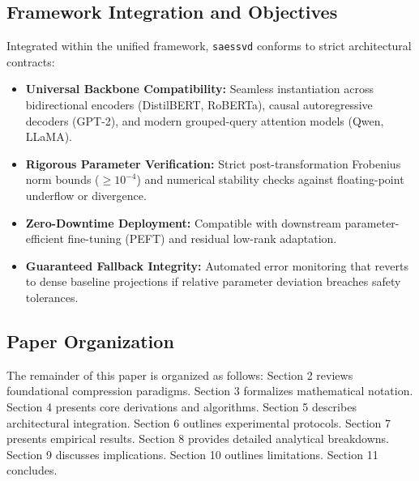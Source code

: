 \subsection{Framework Integration and Objectives}
Integrated within the unified framework, \texttt{saessvd} conforms to strict architectural contracts:
\begin{itemize}
\item \textbf{Universal Backbone Compatibility:} Seamless instantiation across bidirectional encoders (DistilBERT, RoBERTa), causal autoregressive decoders (GPT-2), and modern grouped-query attention models (Qwen, LLaMA).
\item \textbf{Rigorous Parameter Verification:} Strict post-transformation Frobenius norm bounds ($\ge 10^{-4}$) and numerical stability checks against floating-point underflow or divergence.
\item \textbf{Zero-Downtime Deployment:} Compatible with downstream parameter-efficient fine-tuning (PEFT) and residual low-rank adaptation.
\item \textbf{Guaranteed Fallback Integrity:} Automated error monitoring that reverts to dense baseline projections if relative parameter deviation breaches safety tolerances.
\end{itemize}

\subsection{Paper Organization}
The remainder of this paper is organized as follows: Section 2 reviews foundational compression paradigms. Section 3 formalizes mathematical notation. Section 4 presents core derivations and algorithms. Section 5 describes architectural integration. Section 6 outlines experimental protocols. Section 7 presents empirical results. Section 8 provides detailed analytical breakdowns. Section 9 discusses implications. Section 10 outlines limitations. Section 11 concludes.
